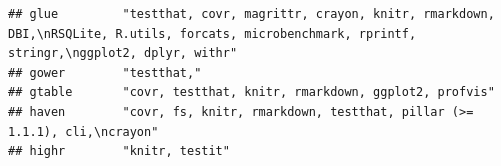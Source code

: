 \documentclass[]{article}
\begin{document}
\begin{verbatim}
## glue         "testthat, covr, magrittr, crayon, knitr, rmarkdown, DBI,\nRSQLite, R.utils, forcats, microbenchmark, rprintf, stringr,\nggplot2, dplyr, withr"                                                                                                                                                                                                                                                                                                                                                                                                                                           
## gower        "testthat,"                                                                                                                                                                                                                                                                                                                                                                                                                                                                                                                                                                               
## gtable       "covr, testthat, knitr, rmarkdown, ggplot2, profvis"                                                                                                                                                                                                                                                                                                                                                                                                                                                                                                                                      
## haven        "covr, fs, knitr, rmarkdown, testthat, pillar (>= 1.1.1), cli,\ncrayon"                                                                                                                                                                                                                                                                                                                                                                                                                                                                                                                   
## highr        "knitr, testit"                                                                                                                                                                                                                                                                                                                                                                                                                                                                                                                                                                           

\end{verbatim}
\end{document}
